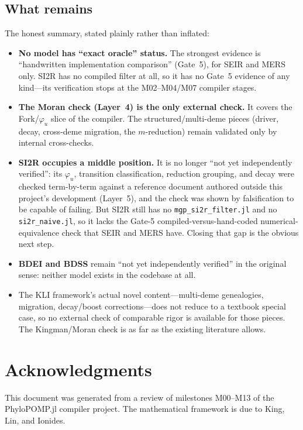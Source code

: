 \documentclass[11pt,leqno]{article}
\newcommand{\pkg}[1]{\textsf{#1}}
\newcommand{\code}[1]{\texttt{#1}}
\theoremstyle{plain}
\theoremstyle{definition}
\begin{document}
\subsection{What remains}

The honest summary, stated plainly rather than inflated:

\begin{itemize}
  \item \textbf{No model has ``exact oracle'' status.}  The strongest
    evidence is ``handwritten implementation comparison'' (Gate~5), for
    SEIR and MERS only.  SI2R has no compiled filter at all, so it has no
    Gate~5 evidence of any kind---its verification stops at the
    M02--M04/M07 compiler stages.

  \item \textbf{The Moran check (Layer~4) is the only external
    check.}  It covers the Fork/$\varphi_u$ slice of the compiler.
    The structured/multi-deme pieces (driver, decay, cross-deme
    migration, the $m$-reduction) remain validated only by internal
    cross-checks.

  \item \textbf{SI2R occupies a middle position.}  It is no longer ``not yet
    independently verified'': its $\varphi_u$, transition classification,
    reduction grouping, and decay were checked term-by-term against a
    reference document authored outside this project's development
    (Layer~5), and the check was shown by falsification to be capable of
    failing.  But SI2R still has no \code{mgp\_si2r\_filter.jl} and no
    \code{si2r\_naive.jl}, so it lacks the Gate-5 compiled-versus-hand-coded
    numerical-equivalence check that SEIR and MERS have.  Closing that gap
    is the obvious next step.

  \item \textbf{BDEI and BDSS} remain ``not yet independently verified'' in
    the original sense: neither model exists in the codebase at all.

  \item The KLI framework's actual novel content---multi-deme
    genealogies, migration, decay/boost corrections---does not reduce
    to a textbook special case, so no external check of comparable rigor
    is available for those pieces.  The Kingman/Moran check is as far
    as the existing literature allows.
\end{itemize}

\section*{Acknowledgments}

This document was generated from a review of milestones M00--M13 of
the \pkg{PhyloPOMP.jl} compiler project.  The mathematical framework is
due to King, Lin, and Ionides.
\end{document}
